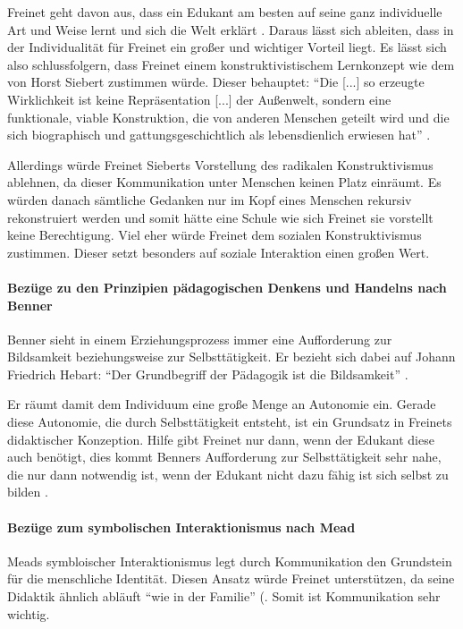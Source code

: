 Freinet geht davon aus, dass ein Edukant am besten auf seine ganz individuelle Art und Weise lernt und sich die Welt erklärt \parencite[vgl.][~496]{Freinet-2000a}.
Daraus lässt sich ableiten, dass in der Individualität für Freinet ein großer und wichtiger Vorteil liegt.
Es lässt sich also schlussfolgern, dass Freinet einem konstruktivistischem Lernkonzept wie dem von Horst Siebert zustimmen würde.
Dieser behauptet: ``Die [...] so erzeugte Wirklichkeit ist keine Repräsentation [...] der Außenwelt, sondern eine funktionale, viable Konstruktion, die von anderen Menschen geteilt wird und die sich biographisch und gattungsgeschichtlich als lebensdienlich erwiesen hat'' \parencite[~6]{siebert-2003}.

Allerdings würde Freinet Sieberts Vorstellung des radikalen Konstruktivismus ablehnen, da dieser Kommunikation unter Menschen keinen Platz einräumt.
Es würden danach sämtliche Gedanken nur im Kopf eines Menschen rekursiv rekonstruiert werden \parencite[vgl.][~10]{siebert-2003} und somit hätte eine Schule wie sich Freinet sie vorstellt keine Berechtigung.
Viel eher würde Freinet dem sozialen Konstruktivismus zustimmen.
Dieser setzt besonders auf soziale Interaktion einen großen Wert.


\paragraph{Bezüge zu den Prinzipien pädagogischen Denkens und Handelns nach Benner}

Benner sieht in einem Erziehungsprozess immer eine Aufforderung zur Bildsamkeit beziehungsweise zur Selbsttätigkeit.
Er bezieht sich dabei auf Johann Friedrich Hebart:
``Der Grundbegriff der Pädagogik ist die Bildsamkeit'' \parencite[~70]{benner-2012}.

Er räumt damit dem Individuum eine große Menge an Autonomie ein.
Gerade diese Autonomie, die durch Selbsttätigkeit entsteht, ist ein Grundsatz in Freinets didaktischer Konzeption.
Hilfe gibt Freinet nur dann, wenn der Edukant diese auch benötigt, dies kommt Benners Aufforderung zur Selbsttätigkeit sehr nahe, die nur dann notwendig ist, wenn der Edukant nicht dazu fähig ist sich selbst zu bilden \parencite[vgl.][~91]{benner-2012}.


\paragraph{Bezüge zum symbolischen Interaktionismus nach Mead}

Meads symbloischer Interaktionismus legt durch Kommunikation den Grundstein für die menschliche Identität.
Diesen Ansatz würde Freinet unterstützen, da seine Didaktik ähnlich abläuft ``wie in der Familie'' \parencite[~109]{Freinet1979}(.
Somit ist Kommunikation sehr wichtig.


